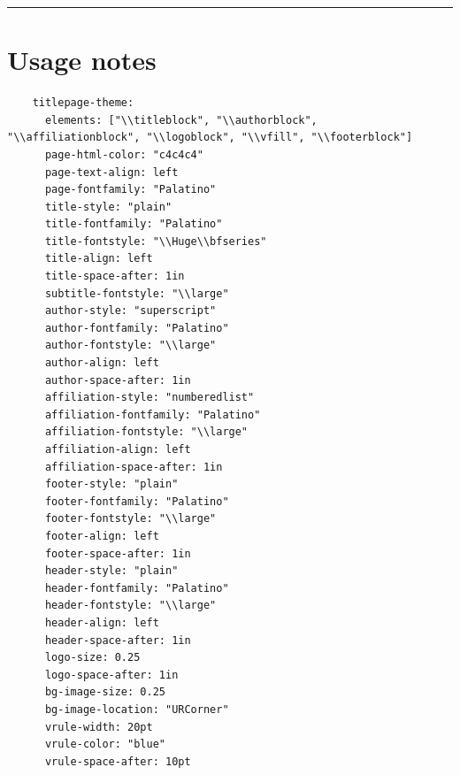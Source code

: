 \documentclass[
  oneside,
  open=any]{scrbook}
\renewcommand*\contentsname{Table of contents}
\newcommand\contentsname{Table of contents}
\begin{document}
\begin{frontmatter}
\begin{titlepage}
%
{%
\hspace{\B}
\rule{\A}{\textheight}
}{}
\end{titlepage}
\setcounter{page}{1}
\end{frontmatter}
\ifdefined\Shaded\renewenvironment{Shaded}{\begin{tcolorbox}[sharp corners, breakable, frame hidden, borderline west={3pt}{0pt}{shadecolor}, enhanced, boxrule=0pt, interior hidden]}{\end{tcolorbox}}\fi

\renewcommand*\contentsname{Table of contents}
{
\setcounter{tocdepth}{2}
\tableofcontents
}
\listoffigures
\listoftables
\mainmatter
\hypertarget{usage-notes}{%
\chapter{Usage notes}\label{usage-notes}}

\begin{verbatim}
    titlepage-theme: 
      elements: ["\\titleblock", "\\authorblock", "\\affiliationblock", "\\logoblock", "\\vfill", "\\footerblock"]
      page-html-color: "c4c4c4"
      page-text-align: left
      page-fontfamily: "Palatino"
      title-style: "plain"
      title-fontfamily: "Palatino"
      title-fontstyle: "\\Huge\\bfseries"
      title-align: left
      title-space-after: 1in
      subtitle-fontstyle: "\\large"
      author-style: "superscript"
      author-fontfamily: "Palatino"
      author-fontstyle: "\\large"
      author-align: left
      author-space-after: 1in
      affiliation-style: "numberedlist"
      affiliation-fontfamily: "Palatino"
      affiliation-fontstyle: "\\large"
      affiliation-align: left
      affiliation-space-after: 1in
      footer-style: "plain"
      footer-fontfamily: "Palatino"
      footer-fontstyle: "\\large"
      footer-align: left
      footer-space-after: 1in
      header-style: "plain"
      header-fontfamily: "Palatino"
      header-fontstyle: "\\large"
      header-align: left
      header-space-after: 1in
      logo-size: 0.25
      logo-space-after: 1in
      bg-image-size: 0.25
      bg-image-location: "URCorner"
      vrule-width: 20pt
      vrule-color: "blue"
      vrule-space-after: 10pt
\end{verbatim}
\end{document}
